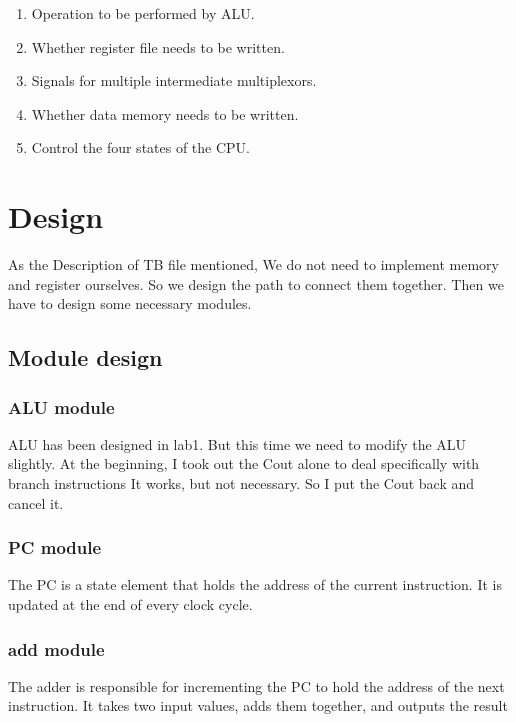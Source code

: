\documentclass[12pt,a4paper]{article}
\begin{document}
\begin{enumerate}
\item Operation to be performed by ALU.
\item Whether register file needs to be written.
\item Signals for multiple intermediate multiplexors.
\item Whether data memory needs to be written. 
\item Control the four states of the CPU.
\end{enumerate}

\newpage

\section{Design}

As the Description of TB file mentioned, We do not need to implement memory and register ourselves.
So we design the path to connect them together.
Then we have to design some necessary modules.

\subsection{Module design}

\subsubsection{ALU module}

ALU has been designed in lab1.
But this time we need to modify the ALU slightly.
At the beginning, I took out the Cout alone to deal specifically with branch instructions
It works, but not necessary.
So I put the Cout back and cancel it.


\subsubsection{PC module}

The PC is a state element that holds the address of the current instruction. 
It is updated at the end of every clock cycle.

\subsubsection{add module}

The adder is responsible for incrementing the PC to hold the address of the next instruction.
It takes two input values, adds them together, and outputs the result
\end{document}
